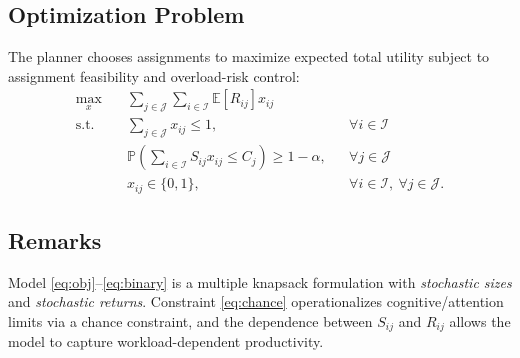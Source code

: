 \documentclass[11pt]{article}
\begin{document}
\subsection*{Optimization Problem}
The planner chooses assignments to maximize expected total utility subject to assignment feasibility and overload-risk control:
\begin{align}
\max_{x} \quad
& \sum_{j\in\mathcal{J}}\sum_{i\in\mathcal{I}} \mathbb{E}\!\left[ R_{ij} \right] x_{ij}
\label{eq:obj}\\[4pt]
\text{s.t.}\quad
& \sum_{j\in\mathcal{J}} x_{ij} \le 1,
&& \forall i\in\mathcal{I}
\label{eq:assign}\\[4pt]
& \mathbb{P}\!\left(
\sum_{i\in\mathcal{I}} S_{ij} x_{ij} \le C_j
\right) \ge 1-\alpha,
&& \forall j\in\mathcal{J}
\label{eq:chance}\\[4pt]
& x_{ij}\in\{0,1\},
&& \forall i\in\mathcal{I},\ \forall j\in\mathcal{J}.
\label{eq:binary}
\end{align}

\subsection*{Remarks}
Model \eqref{eq:obj}--\eqref{eq:binary} is a multiple knapsack formulation with \emph{stochastic sizes} and \emph{stochastic returns}. Constraint \eqref{eq:chance} operationalizes cognitive/attention limits via a chance constraint, and the dependence between $S_{ij}$ and $R_{ij}$ allows the model to capture workload-dependent productivity.
\end{document}
